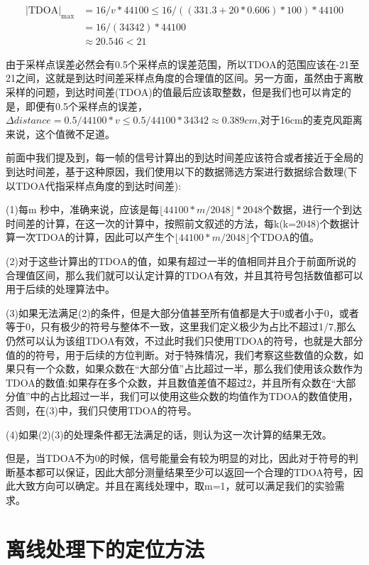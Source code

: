 \documentclass[winfonts,oneside]{njuthesis}
\begin{document}
		\begin{align}
			|\text{TDOA}|_{\text{max}} & = 16 / v * 44100 \leq 16 / ((331.3 + 20 * 0.606) * 100) * 44100  \\
									   & = 16 / (34342) * 44100\\
									   & \approx 20.546 < 21
		\end{align}
		
		由于采样点误差必然会有0.5个采样点的误差范围，所以TDOA的范围应该在-21至21之间，这就是到达时间差采样点角度的合理值的区间。另一方面，虽然由于离散采样的问题，到达时间差(TDOA)的值最后应该取整数，但是我们也可以肯定的是，即便有0.5个采样点的误差，$\Delta distance = 0.5 / 44100 * v \leq 0.5 / 44100 * 34342 \approx 0.389cm$,对于16cm的麦克风距离来说，这个值微不足道。
		
		前面中我们提及到，每一帧的信号计算出的到达时间差应该符合或者接近于全局的到达时间差，基于这种原因，我们使用以下的数据筛选方案进行数据综合数理(下以TDOA代指采样点角度的到达时间差):
		
		(1)每m 秒中，准确来说，应该是每$\lfloor 44100 * m / 2048 \rfloor * 2048 $个数据，进行一个到达时间差的计算，在这一次的计算中，按照前文叙述的方法，每k(k=2048)个数据计算一次TDOA的计算，因此可以产生个$\lfloor 44100 * m / 2048 \rfloor$个TDOA的值。
		
		(2)对于这些计算出的TDOA的值，如果有超过一半的值相同并且介于前面所说的合理值区间，那么我们就可以认定计算的TDOA有效，并且其符号包括数值都可以用于后续的处理算法中。
		
		(3)如果无法满足(2)的条件，但是大部分值甚至所有值都是大于0或者小于0，或者等于0，只有极少的符号与整体不一致，这里我们定义极少为占比不超过1/7,那么仍然可以认为该组TDOA有效，不过此时我们只使用TDOA的符号，也就是大部分值的的符号，用于后续的方位判断。对于特殊情况，我们考察这些数值的众数，如果只有一个众数，如果众数在“大部分值”占比超过一半，那么我们使用该众数作为TDOA的数值;如果存在多个众数，并且数值差值不超过2，并且所有众数在“大部分值”中的占比超过一半，我们可以使用这些众数的均值作为TDOA的数值使用，否则，在(3)中，我们只使用TDOA的符号。
		
		(4)如果(2)(3)的处理条件都无法满足的话，则认为这一次计算的结果无效。
		
		但是，当TDOA不为0的时候，信号能量会有较为明显的对比，因此对于符号的判断基本都可以保证，因此大部分测量结果至少可以返回一个合理的TDOA符号，因此大致方向可以确定。并且在离线处理中，取m=1，就可以满足我们的实验需求。
		
	\section{离线处理下的定位方法}
		
\end{document}
